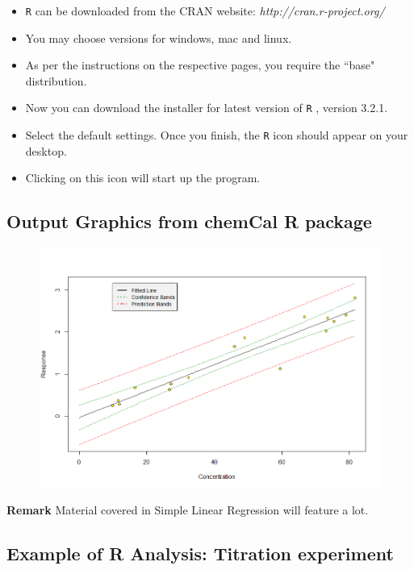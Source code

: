\documentclass[12pt, a4paper]{article}
\begin{document}
\begin{itemize}
	\item \texttt{R} can be downloaded from the CRAN website: \textit{http://cran.r-project.org/}
	\item You may choose versions for windows, mac and linux.
	\item As per the instructions on the respective pages, you require the ``base" distribution.
	\item Now you can download the installer for latest version of \texttt{R} , version 3.2.1.
	\item Select the default settings. Once you finish, the \texttt{R} icon should appear on your desktop.
	\item Clicking on this icon will start up the program.
\end{itemize}

\subsection{Output Graphics from chemCal R package}
\begin{figure}[h!]
\centering
\includegraphics[width=0.9\linewidth]{ChemCal}
\end{figure}

\noindent \textbf{Remark} Material covered in Simple Linear Regression will feature a lot.
\newpage

\subsection{Example of R Analysis: Titration experiment}
	
\end{document}
